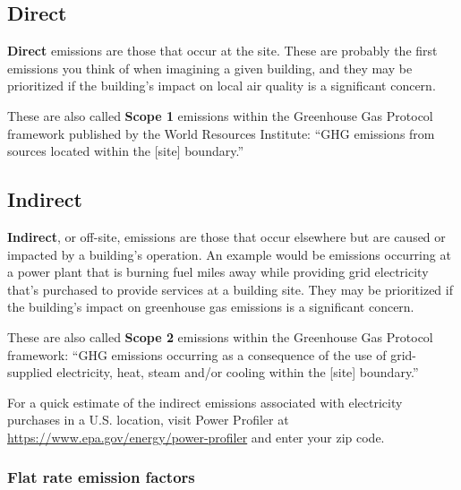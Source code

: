\documentclass[10pt]{article}
\begin{document}
\subsection{Direct}

\textbf{Direct} emissions are those that occur at the site. These are probably the first emissions you think of when imagining a given building, and they may be prioritized if the building's impact on local air quality is a significant concern.

These are also called \textbf{Scope 1} emissions within the Greenhouse Gas Protocol framework published by the World Resources Institute: ``GHG emissions from sources located within
the [site] boundary.'' \cite{ghgprotocol2014}


\subsection{Indirect}

\textbf{Indirect}, or off-site, emissions are those that occur elsewhere but are caused or impacted by a building's operation. An example would be emissions occurring at a power plant that is burning fuel miles away while providing grid electricity that's purchased to provide services at a building site. They may be prioritized if the building's impact on greenhouse gas emissions is a significant concern.

These are also called \textbf{Scope 2} emissions within the Greenhouse Gas Protocol framework: ``GHG emissions occurring as a consequence  of the use of grid-supplied electricity, heat, 
steam and/or cooling within the [site] boundary.'' \cite{ghgprotocol2014}

For a quick estimate of the indirect emissions associated with electricity purchases in a U.S. location, visit Power Profiler at \url{https://www.epa.gov/energy/power-profiler} and enter your zip code.

\subsubsection{Flat rate emission factors}
\end{document}
